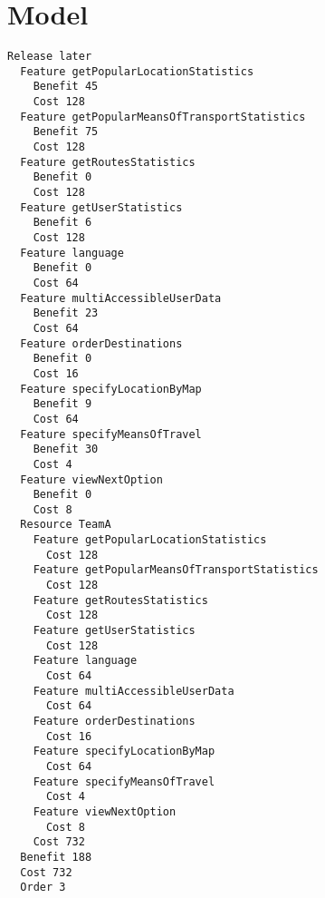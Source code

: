 \chapter{Model}


\begin{lstlisting}
Release later
  Feature getPopularLocationStatistics
    Benefit 45
    Cost 128
  Feature getPopularMeansOfTransportStatistics
    Benefit 75
    Cost 128
  Feature getRoutesStatistics
    Benefit 0
    Cost 128
  Feature getUserStatistics
    Benefit 6
    Cost 128
  Feature language
    Benefit 0
    Cost 64
  Feature multiAccessibleUserData
    Benefit 23
    Cost 64
  Feature orderDestinations
    Benefit 0
    Cost 16
  Feature specifyLocationByMap
    Benefit 9
    Cost 64
  Feature specifyMeansOfTravel
    Benefit 30
    Cost 4
  Feature viewNextOption
    Benefit 0
    Cost 8
  Resource TeamA
    Feature getPopularLocationStatistics
      Cost 128
    Feature getPopularMeansOfTransportStatistics
      Cost 128
    Feature getRoutesStatistics
      Cost 128
    Feature getUserStatistics
      Cost 128
    Feature language
      Cost 64
    Feature multiAccessibleUserData
      Cost 64
    Feature orderDestinations
      Cost 16
    Feature specifyLocationByMap
      Cost 64
    Feature specifyMeansOfTravel
      Cost 4
    Feature viewNextOption
      Cost 8
    Cost 732
  Benefit 188
  Cost 732
  Order 3

\end{lstlisting}